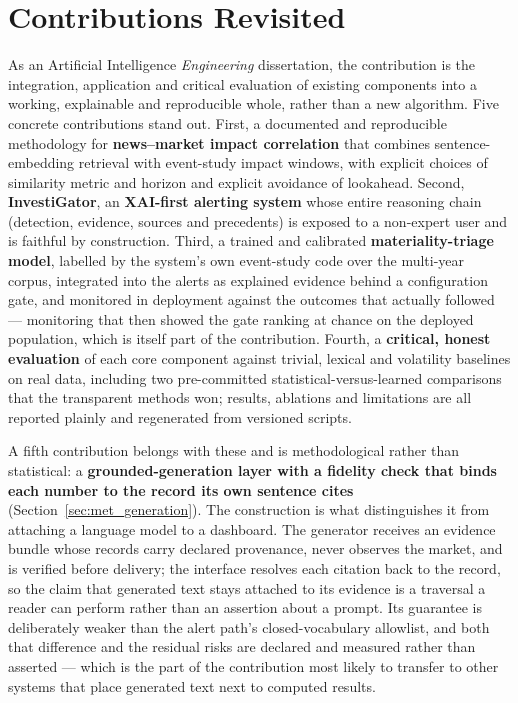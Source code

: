 \section{Contributions Revisited}
\label{sec:concl_contributions}

As an Artificial Intelligence \emph{Engineering} dissertation, the contribution is the integration,
application and critical evaluation of existing components into a working, explainable and reproducible
whole, rather than a new algorithm. Five concrete contributions stand out. First, a documented and
reproducible methodology for \textbf{news--market impact correlation} that combines sentence-embedding
retrieval with event-study impact windows, with explicit choices of similarity metric and horizon and
explicit avoidance of lookahead. Second, \textbf{InvestiGator}, an \textbf{XAI-first alerting system} whose
entire reasoning chain (detection, evidence, sources and precedents) is exposed to a non-expert
user and is faithful by construction. Third, a trained and calibrated \textbf{materiality-triage
model}, labelled by the system's own event-study code over the multi-year corpus, integrated into the
alerts as explained evidence behind a configuration gate, and monitored in deployment against the
outcomes that actually followed --- monitoring that then showed the gate ranking at chance on the
deployed population, which is itself part of the contribution. Fourth, a \textbf{critical, honest evaluation} of each
core component against trivial, lexical and volatility baselines on real data, including two
pre-committed statistical-versus-learned comparisons that the transparent methods won; results,
ablations and limitations are all reported plainly and regenerated from versioned scripts.

A fifth contribution belongs with these and is methodological rather than statistical: a
\textbf{grounded-generation layer with a fidelity check that binds each number to the record its own
sentence cites} (Section~\ref{sec:met_generation}). The construction is what distinguishes it from
attaching a language model to a dashboard. The generator receives an evidence bundle whose records
carry declared provenance, never observes the market, and is verified before delivery; the interface
resolves each citation back to the record, so the claim that generated text stays attached to its
evidence is a traversal a reader can perform rather than an assertion about a prompt. Its guarantee
is deliberately weaker than the alert path's closed-vocabulary allowlist, and both that difference
and the residual risks are declared and measured rather than asserted --- which is the part of the
contribution most likely to transfer to other systems that place generated text next to computed
results.

